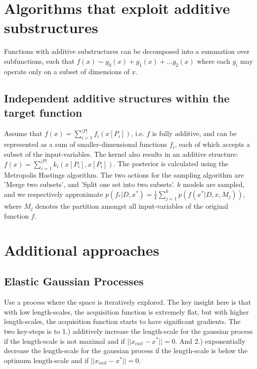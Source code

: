 \section{Algorithms that exploit additive substructures}

Functions with additive substructures can be decomposed into a summation over subfunctions, such that
$ f(x) \sim g_0(x) + g_1(x) + \ldots g_2(x) $ where each $g_i$ may operate only on a subset of dimensions of $x$.

\subsection{Independent additive structures within the target function}

\citep{Gardner2017} Assume that $f(x) = \sum_{i=1}^{ |P| } f_i (x[P_i] )$, i.e. $f$ is fully additive, and can be represented as a sum of smaller-dimensional functions $f_i$, each of which accepts a subset of the input-variables.
The kernel also results in an additive structure: $f(x) = \sum_{i=1}^{ |P| } k_i (x[P_i], x[P_i])$.
The posterior is calculated using the Metropolis Hastings algorithm.
The two actions for the sampling algorithm are 'Merge two subsets', and 'Split one set into two subsets'.
$k$ models are sampled, and we respectively approximate $p(f_* | D, x^*) = \frac{1}{k} \sum_{j=1}^{k} p( f(x^* | D, x, M_j) )$, where $M_j$ denotes the partition amongst all input-variables of the original function $f$.

\section{Additional approaches}

\subsection{Elastic Gaussian Processes}

\citep{Rana2017} Use a process where the space is iteratively explored.
The key insight here is that with low length-scales, the acquisition function is extremely flat, but with higher length-scales, the acquisition function starts to have significant gradients.
The two key-steps is to 1.) additively increase the length-scale for the gaussian process if the length-scale is not maximal and if $|| x_{init} - x^* || = 0$.
And 2.) exponentially decrease the length-scale for the gaussian process if the length-scale is below the optimum length-scale and if $|| x_{init} - x^* || = 0$.


